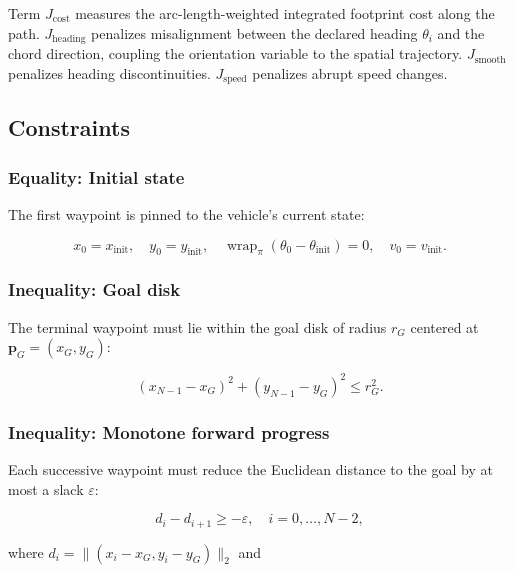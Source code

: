 \documentclass[11pt,a4paper]{article}
\begin{document}
Term $J_{\mathrm{cost}}$ measures the arc-length-weighted integrated footprint
cost along the path.
$J_{\mathrm{heading}}$ penalizes misalignment between the declared heading
$\theta_i$ and the chord direction, coupling the orientation variable to the
spatial trajectory.
$J_{\mathrm{smooth}}$ penalizes heading discontinuities.
$J_{\mathrm{speed}}$ penalizes abrupt speed changes.

\subsection{Constraints}

\subsubsection*{Equality: Initial state}

The first waypoint is pinned to the vehicle's current state:

\begin{equation}
  x_0 = x_{\mathrm{init}}, \quad
  y_0 = y_{\mathrm{init}}, \quad
  \operatorname{wrap}_\pi(\theta_0 - \theta_{\mathrm{init}}) = 0, \quad
  v_0 = v_{\mathrm{init}}.
\end{equation}

\subsubsection*{Inequality: Goal disk}

The terminal waypoint must lie within the goal disk of radius $r_G$ centered at
$\mathbf{p}_G = (x_G, y_G)$:

\begin{equation}
  (x_{N-1} - x_G)^2 + (y_{N-1} - y_G)^2 \le r_G^2.
\end{equation}

\subsubsection*{Inequality: Monotone forward progress}

Each successive waypoint must reduce the Euclidean distance to the goal by at
most a slack $\varepsilon$:

\begin{equation}
  \label{eq:progress}
  d_i - d_{i+1} \ge -\varepsilon, \quad i = 0, \ldots, N-2,
\end{equation}

where $d_i = \|(x_i - x_G, y_i - y_G)\|_2$ and
\end{document}

